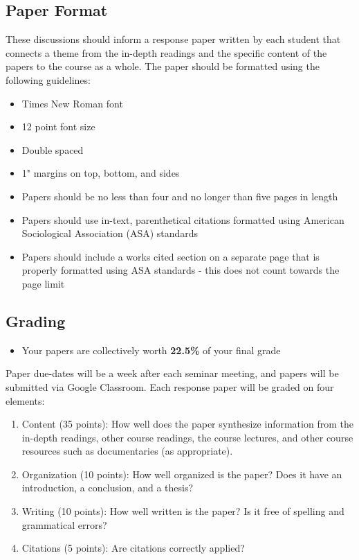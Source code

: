 \documentclass[]{book}
\providecommand{\tightlist}{%
  \setlength{\itemsep}{0pt}\setlength{\parskip}{0pt}}
\newenvironment{rmdblock}[1]
  {\begin{shaded*}
  \begin{itemize}
  \renewcommand{\labelitemi}{
    \raisebox{-.7\height}[0pt][0pt]{
      {\setkeys{Gin}{width=3em,keepaspectratio}\texttt{[image: images/\#1]}}
    }
  }
  \item
  }
  {
  \end{itemize}
  \end{shaded*}
  }
\newenvironment{rmdtip}
  {\begin{rmdblock}{tip}}
  {\end{rmdblock}}
\begin{document}
\hypertarget{paper-format}{%
\subsection{Paper Format}\label{paper-format}}

These discussions should inform a response paper written by each student that connects a theme from the in-depth readings and the specific content of the papers to the course as a whole. The paper should be formatted using the following guidelines:

\begin{itemize}
\tightlist
\item
  Times New Roman font
\item
  12 point font size
\item
  Double spaced
\item
  1" margins on top, bottom, and sides
\item
  Papers should be no less than four and no longer than five pages in length
\item
  Papers should use in-text, parenthetical citations formatted using American Sociological Association (ASA) standards
\item
  Papers should include a works cited section on a separate page that is properly formatted using ASA standards - this does not count towards the page limit
\end{itemize}

\hypertarget{grading-1}{%
\subsection{Grading}\label{grading-1}}

\begin{rmdtip}
Your papers are collectively worth \textbf{22.5\%} of your final grade
\end{rmdtip}

Paper due-dates will be a week after each seminar meeting, and papers will be submitted via Google Classroom. Each response paper will be graded on four elements:

\begin{enumerate}
\def\labelenumi{\arabic{enumi}.}
\tightlist
\item
  Content (35 points): How well does the paper synthesize information
  from the in-depth readings, other course readings, the course
  lectures, and other course resources such as documentaries (as
  appropriate).
\item
  Organization (10 points): How well organized is the paper? Does it
  have an introduction, a conclusion, and a thesis?
\item
  Writing (10 points): How well written is the paper? Is it free of
  spelling and grammatical errors?
\item
  Citations (5 points): Are citations correctly applied?
\end{enumerate}
\end{document}
